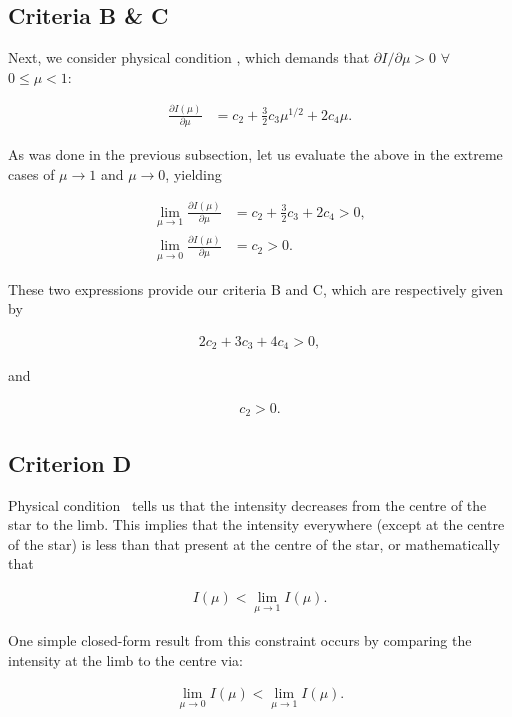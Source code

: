 \subsection{Criteria B \& C}

Next, we consider physical condition \II, which demands that 
$\partial I/\partial \mu>0$ $\forall$ $0\leq\mu<1$:

\begin{align}
\frac{ \partial I(\mu) }{\partial \mu } &= c_2 + \frac{3}{2} c_3 \mu^{1/2} + 2 c_4 \mu.
\end{align}

As was done in the previous subsection, let us evaluate the above in the extreme 
cases of $\mu\to1$ and $\mu\to0$, yielding

\begin{align}
\lim_{\mu\to1} \frac{ \partial I(\mu) }{\partial \mu } &= c_2 + \frac{3}{2} c_3 + 2 c_4 > 0,\nonumber\\
\lim_{\mu\to0} \frac{ \partial I(\mu) }{\partial \mu } &= c_2 > 0.
\end{align}

These two expressions provide our criteria B and C, which are respectively
given by

\begin{align}
2 c_2 + 3 c_3 + 4 c_4 > 0,
\label{eqn:criterionB}
\end{align}

and

\begin{align}
c_2 > 0.
\label{eqn:criterionC}
\end{align}

\subsection{Criterion D}

Physical condition \II\ tells us that the intensity decreases from the centre of 
the star to the limb. This implies that the intensity everywhere (except at the
centre of the star) is less than that present at the centre of the star, or
mathematically that

\begin{align}
I(\mu) < \lim_{\mu\to1} I(\mu).
\end{align}

One simple closed-form result from this constraint occurs by comparing the
intensity at the limb to the centre via:

\begin{align}
\lim_{\mu\to0} I(\mu) < \lim_{\mu\to1} I(\mu).
\end{align}

